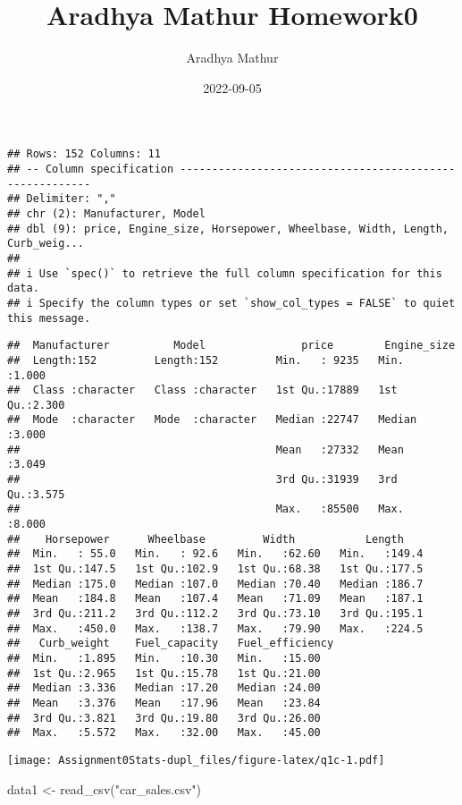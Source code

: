 \documentclass[
]{article}
\title{Aradhya Mathur Homework0}
\author{Aradhya Mathur}
\date{2022-09-05}
\newenvironment{Shaded}{\begin{snugshade}}{\end{snugshade}}
\newcommand{\FunctionTok}[1]{\textcolor[rgb]{0.00,0.00,0.00}{#1}}
\newcommand{\NormalTok}[1]{#1}
\newcommand{\OtherTok}[1]{\textcolor[rgb]{0.56,0.35,0.01}{#1}}
\newcommand{\StringTok}[1]{\textcolor[rgb]{0.31,0.60,0.02}{#1}}
\begin{document}
\maketitle

\begin{verbatim}
## Rows: 152 Columns: 11
## -- Column specification --------------------------------------------------------
## Delimiter: ","
## chr (2): Manufacturer, Model
## dbl (9): price, Engine_size, Horsepower, Wheelbase, Width, Length, Curb_weig...
## 
## i Use `spec()` to retrieve the full column specification for this data.
## i Specify the column types or set `show_col_types = FALSE` to quiet this message.
\end{verbatim}

\begin{verbatim}
##  Manufacturer          Model               price        Engine_size   
##  Length:152         Length:152         Min.   : 9235   Min.   :1.000  
##  Class :character   Class :character   1st Qu.:17889   1st Qu.:2.300  
##  Mode  :character   Mode  :character   Median :22747   Median :3.000  
##                                        Mean   :27332   Mean   :3.049  
##                                        3rd Qu.:31939   3rd Qu.:3.575  
##                                        Max.   :85500   Max.   :8.000  
##    Horsepower      Wheelbase         Width           Length     
##  Min.   : 55.0   Min.   : 92.6   Min.   :62.60   Min.   :149.4  
##  1st Qu.:147.5   1st Qu.:102.9   1st Qu.:68.38   1st Qu.:177.5  
##  Median :175.0   Median :107.0   Median :70.40   Median :186.7  
##  Mean   :184.8   Mean   :107.4   Mean   :71.09   Mean   :187.1  
##  3rd Qu.:211.2   3rd Qu.:112.2   3rd Qu.:73.10   3rd Qu.:195.1  
##  Max.   :450.0   Max.   :138.7   Max.   :79.90   Max.   :224.5  
##   Curb_weight    Fuel_capacity   Fuel_efficiency
##  Min.   :1.895   Min.   :10.30   Min.   :15.00  
##  1st Qu.:2.965   1st Qu.:15.78   1st Qu.:21.00  
##  Median :3.336   Median :17.20   Median :24.00  
##  Mean   :3.376   Mean   :17.96   Mean   :23.84  
##  3rd Qu.:3.821   3rd Qu.:19.80   3rd Qu.:26.00  
##  Max.   :5.572   Max.   :32.00   Max.   :45.00
\end{verbatim}

\texttt{[image: Assignment0Stats-dupl\_files/figure-latex/q1c-1.pdf]}

\begin{Shaded}
\begin{Highlighting}[]
\NormalTok{data1 }\OtherTok{\textless{}{-}} \FunctionTok{read\_csv}\NormalTok{(}\StringTok{"car\_sales.csv"}\NormalTok{)}
\end{Highlighting}
\end{Shaded}
\end{document}

